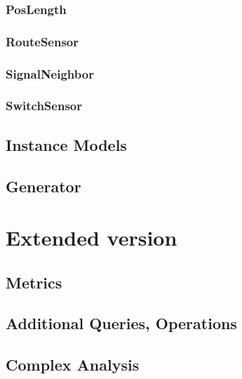 \subsubsection{PosLength}


\subsubsection{RouteSensor}


\subsubsection{SignalNeighbor}


\subsubsection{SwitchSensor}




\subsection{Instance Models}



\subsection{Generator}

\section{Extended version}
\subsection{Metrics}
\subsection{Additional Queries, Operations}
\subsection{Complex Analysis}






